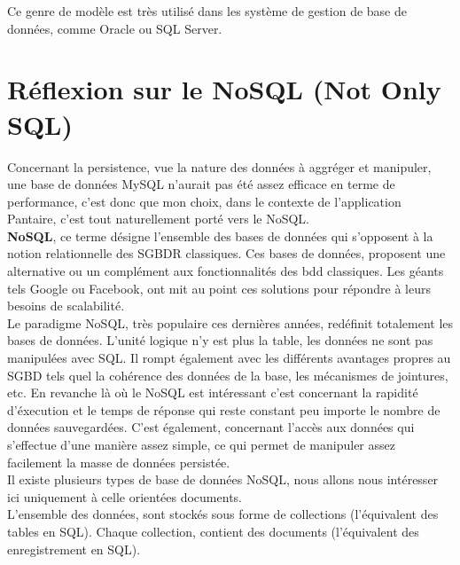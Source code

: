 \documentclass{report}
\newcommand{\jumpOne}{\\[1\baselineskip]}
\begin{document}
Ce genre de modèle est très utilisé dans les système de gestion de base de données, comme Oracle ou SQL Server.





\newpage





\section{Réflexion sur le NoSQL (Not Only SQL)}
Concernant la persistence, vue la nature des données à aggréger et manipuler, une base de données \gls{MySQL} n'aurait pas été assez efficace en terme de performance, c'est donc que mon choix, dans le contexte de l'application Pantaire, c'est tout naturellement porté vers le \gls{NoSQL}. 
\jumpOne
\textbf{\gls{NoSQL}}, ce terme désigne l'ensemble des bases de données qui s'opposent à la notion relationnelle des \gls{SGBDR} classiques. Ces bases de données, proposent une alternative ou un complément aux fonctionnalités des bdd classiques. Les géants tels Google ou Facebook, ont mit au point ces solutions pour répondre à leurs besoins de scalabilité. 
\jumpOne
Le paradigme \gls{NoSQL}, très populaire ces dernières années, redéfinit totalement les bases de données. L'unité logique n'y est plus la table, les données ne sont pas manipulées avec SQL. Il rompt également avec les différents avantages propres au SGBD tels quel la cohérence des données de la base, les mécanismes de jointures, etc. 
En revanche là où le \gls{NoSQL} est intéressant c'est concernant la rapidité d'éxecution et le temps de réponse qui reste constant peu importe le nombre de données sauvegardées.
C'est également, concernant l'accès aux données qui s'effectue d'une manière assez simple, ce qui permet de manipuler assez facilement la masse de données persistée. 
\jumpOne
Il existe plusieurs types de base de données \gls{NoSQL}, nous allons nous intéresser ici uniquement à celle orientées documents. 
\jumpOne
L'ensemble des données, sont stockés sous forme de collections (l'équivalent des tables en SQL). Chaque collection, contient des documents (l'équivalent des enregistrement en SQL).


\end{document}
